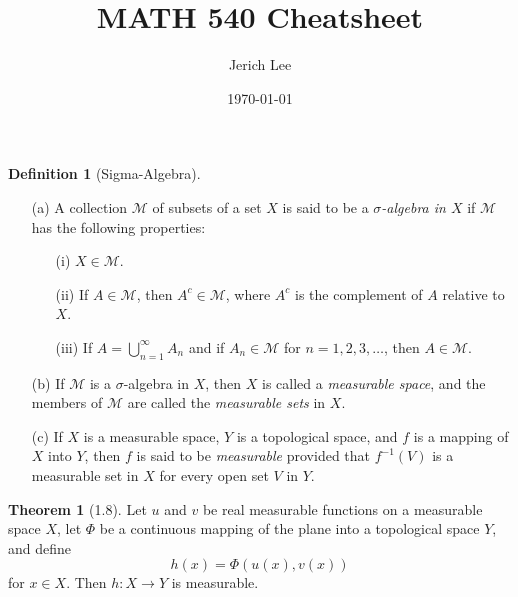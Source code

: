 \documentclass[12pt]{article}
\title{MATH 540 Cheatsheet}
\author{Jerich Lee}
\date{\today}
\theoremstyle{definition} %
\newtheorem{theorem}{Theorem}
\newtheorem{definition}{Definition}
\theoremstyle{plain} %
\begin{document}
\maketitle

\begin{definition}[Sigma-Algebra]
  \begin{enumerate}
    \noindent
      \item[(a)] A collection $\mathcal{M}$ of subsets of a set $X$ is said to be a \emph{$\sigma$-algebra in $X$} if $\mathcal{M}$ has the following properties:
      \begin{itemize}
          \item[(i)] $X \in \mathcal{M}$.
          \item[(ii)] If $A \in \mathcal{M}$, then $A^c \in \mathcal{M}$, where $A^c$ is the complement of $A$ relative to $X$.
          \item[(iii)] If $A = \bigcup_{n=1}^{\infty} A_n$ and if $A_n \in \mathcal{M}$ for $n = 1, 2, 3, \dots$, then $A \in \mathcal{M}$.
      \end{itemize}
  
      \item[(b)] If $\mathcal{M}$ is a $\sigma$-algebra in $X$, then $X$ is called a \emph{measurable space}, and the members of $\mathcal{M}$ are called the \emph{measurable sets} in $X$.
  
      \item[(c)] If $X$ is a measurable space, $Y$ is a topological space, and $f$ is a mapping of $X$ into $Y$, then $f$ is said to be \emph{measurable} provided that $f^{-1}(V)$ is a measurable set in $X$ for every open set $V$ in $Y$.
  \end{enumerate}
  \end{definition}
  \begin{theorem}[1.8]
    Let $u$ and $v$ be real measurable functions on a measurable space $X$, let $\Phi$ be a continuous mapping of the plane into a topological space $Y$, and define
    \[
    h(x) = \Phi(u(x), v(x))
    \]
    for $x \in X$. Then $h \colon X \to Y$ is measurable.
    \end{theorem}
    
\end{document}
